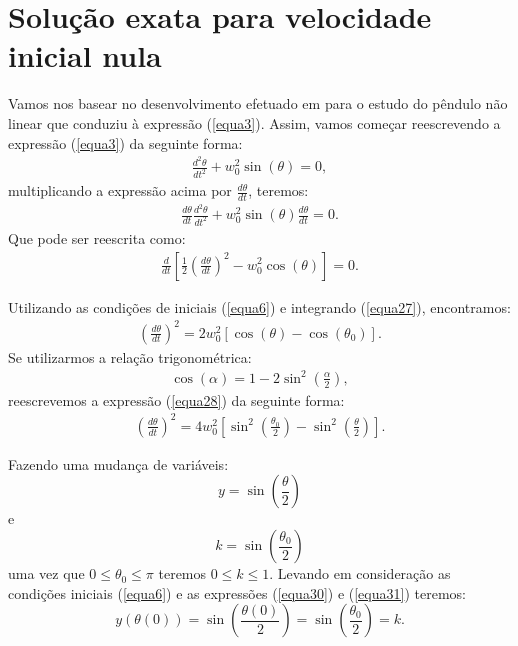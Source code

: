 \documentclass[12pt,openright,twoside,english,brazil]{abntex2}
\begin{document}
\section{Solução exata para velocidade inicial nula}
Vamos nos basear no desenvolvimento efetuado em \cite{bcmbn} para o estudo do pêndulo não linear que conduziu à expressão (\ref{equa3}). Assim, vamos começar reescrevendo a expressão (\ref{equa3}) da seguinte forma:
\begin{eqnarray}
 \frac{d^2 \theta}{dt^2} + w_0^2 \sin{(\theta)} = 0,
 \label{equa25}
\end{eqnarray}
multiplicando a expressão acima por $\frac{d\theta}{dt}$, teremos:
\begin{eqnarray}
 \frac{d\theta}{dt} \frac{d^2 \theta}{dt^2} + w_0^2 \sin{(\theta)} \frac{d\theta}{dt} = 0.
 \label{equa26}
\end{eqnarray}
Que pode ser reescrita como:
\begin{eqnarray}
 \frac{d}{dt} \left[ \frac{1}{2} \left( \frac{d \theta}{dt} \right)^2 - w_0^2 \cos{(\theta)} \right]= 0.
 \label{equa27}
\end{eqnarray}

Utilizando as condições de iniciais (\ref{equa6}) e integrando (\ref{equa27}), encontramos:
\begin{eqnarray}
 \left( \frac{d\theta}{dt} \right)^2 = 2w_0^2 \left[ \cos{(\theta)} - \cos{(\theta_0)} \right].
 \label{equa28}   
\end{eqnarray}
Se utilizarmos a relação trigonométrica:
\begin{eqnarray}
 \cos{(\alpha)} = 1 - 2 \sin^2{\left( \frac{\alpha}{2} \right)}, \nonumber
\end{eqnarray}
reescrevemos a expressão (\ref{equa28}) da seguinte forma:
\begin{eqnarray}
 \left( \frac{d\theta}{dt} \right)^2 = 4w_0^2 \left[ \sin^2{\left( \frac{\theta_0}{2}\right)} - \sin^2{\left( \frac{\theta}{2} \right)} \right].
 \label{equa29}
\end{eqnarray}

Fazendo uma mudança de variáveis:
\begin{equation}
 y = \sin{\left( \frac{\theta}{2}\right)}
 \label{equa30}
\end{equation}
e
\begin{equation}
 k = \sin{\left( \frac{\theta_0}{2}\right)}
 \label{equa31}
\end{equation}
uma vez que $0\leq \theta_0 \leq \pi$ teremos $0\leq k \leq 1$. Levando em consideração as condições iniciais (\ref{equa6}) e as expressões (\ref{equa30}) e (\ref{equa31}) teremos:
\begin{equation}
 y(\theta(0)) = \sin{\left( \frac{\theta(0)}{2} \right)} = \sin{\left( \frac{\theta_0}{2}\right)} = k.
\end{equation}
\end{document}
